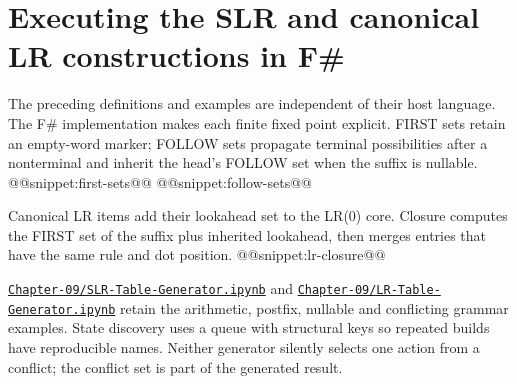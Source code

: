 \section{Executing the SLR and canonical LR constructions in F\#}
The preceding definitions and examples are independent of their host language.
The F\# implementation makes each finite fixed point explicit.
FIRST sets retain an empty-word marker; FOLLOW sets propagate terminal possibilities after a nonterminal and inherit the head's FOLLOW set when the suffix is nullable.
@@snippet:first-sets@@
@@snippet:follow-sets@@

Canonical LR items add their lookahead set to the LR(0) core.
Closure computes the FIRST set of the suffix plus inherited lookahead, then merges entries that have the same rule and dot position.
@@snippet:lr-closure@@

\href{../../Chapter-09/SLR-Table-Generator.ipynb}{\nolinkurl{Chapter-09/SLR-Table-Generator.ipynb}} and \href{../../Chapter-09/LR-Table-Generator.ipynb}{\nolinkurl{Chapter-09/LR-Table-Generator.ipynb}} retain the arithmetic, postfix, nullable and conflicting grammar examples.
State discovery uses a queue with structural keys so repeated builds have reproducible names.
Neither generator silently selects one action from a conflict; the conflict set is part of the generated result.
